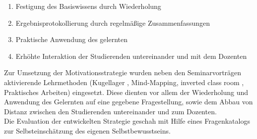 \begin{enumerate}
\item Festigung des Basiswissens durch Wiederholung
\item Ergebnisprotokollierung durch regelmäßige Zusammenfassungen
\item Praktische Anwendung des gelernten
\item Erhöhte Interaktion der Studierenden untereinander und mit dem Dozenten
\end{enumerate}
Zur Umsetzung der Motivationsstrategie wurden neben den Seminarvorträgen aktivierende Lehrmethoden (Kugellager \cite{Leisen.2003}, Mind-Mapping, inverted class room \cite{Uzunboylu.2015, AsksoyG.2016}, Praktisches Arbeiten) eingesetzt. Diese dienten vor allem der Wiederholung und Anwendung des Gelernten auf eine gegebene Fragestellung, sowie dem Abbau von Distanz zwischen den Studierenden untereinander und zum Dozenten.\\
\noindent
Die Evaluation der entwickelten Strategie geschah mit Hilfe eines Fragenkatalogs zur Selbsteinschätzung des eigenen Selbstbewusstseins.  

